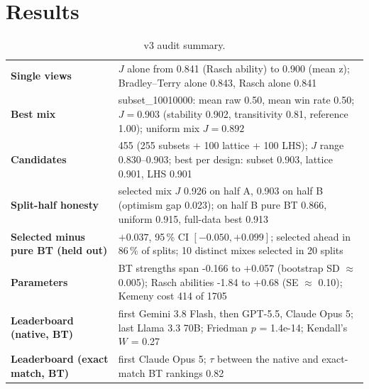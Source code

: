 \documentclass[11pt]{article}
\begin{document}
\section{Results}
\begin{table}[htbp]\centering\small\caption{v3 audit summary.}\label{tab:v3_summary}
\begin{tabularx}{\textwidth}{>{\bfseries}p{} L}\toprule
Single views & $J$ alone from 0.841 (Rasch ability) to 0.900 (mean z); Bradley--Terry alone 0.843, Rasch alone 0.841 \\
Best mix & subset\_\allowbreak{}10010000: mean raw 0.50, mean win rate 0.50; $J = 0.903$ (stability 0.902, transitivity 0.81, reference 1.00); uniform mix $J = 0.892$ \\
Candidates & 455 (255 subsets + 100 lattice + 100 LHS); $J$ range 0.830--0.903; best per design: subset 0.903, lattice 0.901, LHS 0.901 \\
Split-half honesty & selected mix $J$ 0.926 on half A, 0.903 on half B (optimism gap 0.023); on half B pure BT 0.866, uniform 0.915, full-data best 0.913 \\
Selected minus pure BT (held out) & $+0.037$, 95\,\% CI $[-0.050, +0.099]$; selected ahead in 86\,\% of splits; 10 distinct mixes selected in 20 splits \\
Parameters & BT strengths span -0.166 to +0.057 (bootstrap SD $\approx$ 0.005); Rasch abilities -1.84 to +0.68 (SE $\approx$ 0.10); Kemeny cost 414 of 1705 \\
Leaderboard (native, BT) & first Gemini 3.8 Flash, then GPT-5.5, Claude Opus 5; last Llama 3.3 70B; Friedman $p$ = 1.4e-14; Kendall's $W$ = 0.27 \\
Leaderboard (exact match, BT) & first Claude Opus 5; $\tau$ between the native and exact-match BT rankings 0.82 \\
\bottomrule\end{tabularx}\end{table}
\end{document}
